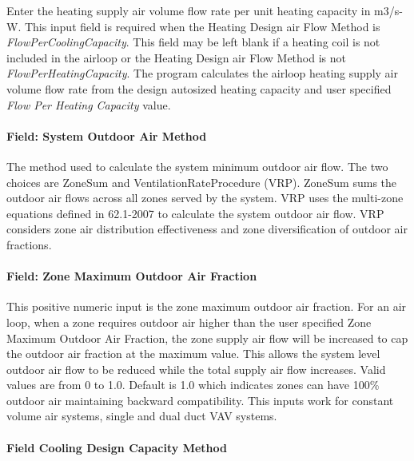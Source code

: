 Enter the heating supply air volume flow rate per unit heating capacity in m3/s-W. This input field is required when the Heating Design air Flow Method is \emph{FlowPerCoolingCapacity}. This field may be left blank if a heating coil is not included in the airloop or the Heating Design air Flow Method is not \emph{FlowPerHeatingCapacity}. The program calculates the airloop heating supply air volume flow rate from the design autosized heating capacity and user specified \emph{Flow Per Heating Capacity} value.

\paragraph{Field: System Outdoor Air Method}\label{field-system-outdoor-air-method-000}

The method used to calculate the system minimum outdoor air flow. The two choices are ZoneSum and VentilationRateProcedure (VRP). ZoneSum sums the outdoor air flows across all zones served by the system. VRP uses the multi-zone equations defined in 62.1-2007 to calculate the system outdoor air flow. VRP considers zone air distribution effectiveness and zone diversification of outdoor air fractions.

\paragraph{Field: Zone Maximum Outdoor Air Fraction}\label{field-zone-maximum-outdoor-air-fraction-000}

This positive numeric input is the zone maximum outdoor air fraction. For an air loop, when a zone requires outdoor air higher than the user specified Zone Maximum Outdoor Air Fraction, the zone supply air flow will be increased to cap the outdoor air fraction at the maximum value. This allows the system level outdoor air flow to be reduced while the total supply air flow increases. Valid values are from 0 to 1.0. Default is 1.0 which indicates zones can have 100\% outdoor air maintaining backward compatibility. This inputs work for constant volume air systems, single and dual duct VAV systems.

\paragraph{Field Cooling Design Capacity Method}\label{field-cooling-design-capacity-method-1}

